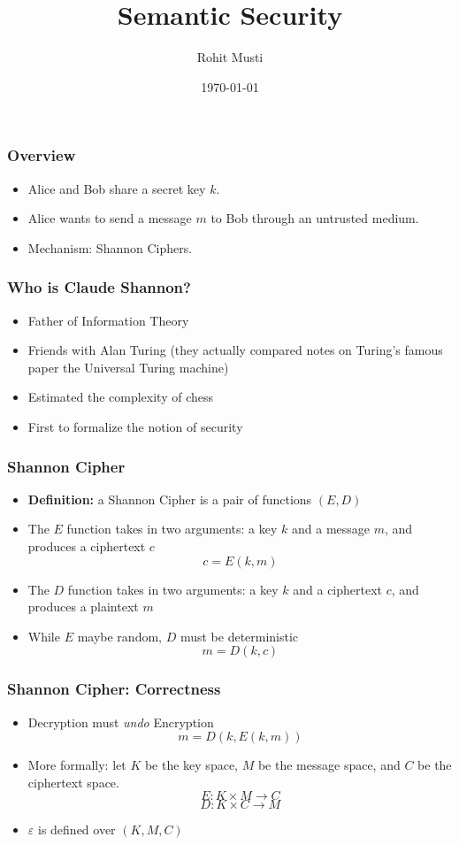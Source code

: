 \documentclass{beamer}
\title{Semantic Security}
\author{Rohit Musti}
\institute{CUNY - Hunter College}
\date{\today}
\begin{document}
 
\frame{\titlepage}


\begin{frame}
\frametitle{Overview}
\begin{itemize}
    \item Alice and Bob share a secret key \(k\). \pause
    \item Alice wants to send a message \(m\) to Bob through an untrusted medium. \pause
    \item Mechanism: Shannon Ciphers.
\end{itemize}
\end{frame}

\begin{frame}
\frametitle{Who is Claude Shannon?}
\begin{itemize}
    \item Father of Information Theory \pause
    \item Friends with Alan Turing (they actually compared notes on Turing's famous paper the Universal Turing machine) \pause
    \item Estimated the complexity of chess \pause
    \item First to formalize the notion of security
\end{itemize}
\end{frame}

\begin{frame}
\frametitle{Shannon Cipher}
\begin{itemize}
    \item \textbf{Definition:} a Shannon Cipher is a pair of functions \((E, D)\)\pause
    \item The \(E\) function takes in two arguments: a key \(k\) and a message \(m\), and produces a ciphertext \(c\) \[c = E(k, m)\] \pause
    \item The \(D\) function takes in two arguments: a key \(k\) and a ciphertext \(c\), and produces a plaintext \(m\) \pause
    \item While \(E\) maybe random, \(D\) must be deterministic
    \[m = D(k, c)\]
\end{itemize}
\end{frame}

\begin{frame}
\frametitle{Shannon Cipher: Correctness}
\begin{itemize}
    \item Decryption must \textit{undo} Encryption \pause \[m = D(k, E(k, m))\]
    \item More formally: let \(K\) be the key space, \(M\) be the message space, and \(C\) be the ciphertext space.
    \pause \[E: K \times M \rightarrow C\]
    \pause \[D: K \times C \rightarrow M\] \pause
    \item \(\varepsilon\) is defined over \((K, M, C)\)
\end{itemize}
\end{frame}
\end{document}
